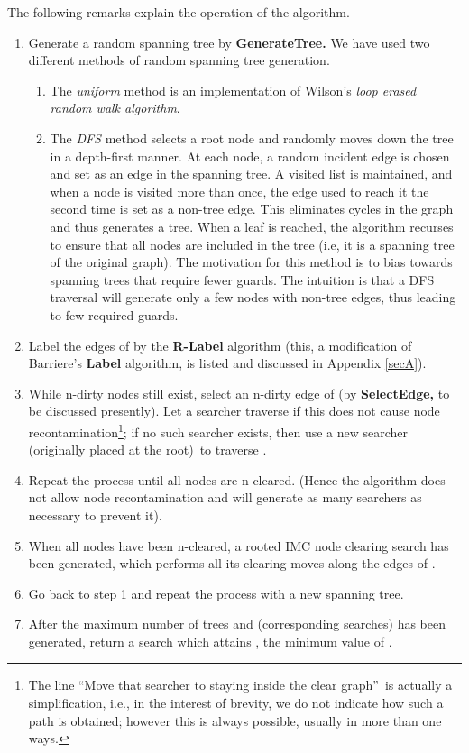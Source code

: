 \documentclass[11pt]{article}\usepackage{amsmath}
\begin{document}
The following remarks explain the operation of the algorithm.

\begin{enumerate}
\item Generate a random spanning tree  by \textbf{GenerateTree.}
We have used two different methods of random spanning tree generation.

\begin{enumerate}
\item The \emph{uniform} method is an implementation of Wilson's
\cite{Wilson1} \emph{loop erased random walk algorithm}.

\item The \emph{DFS} method selects a root node and randomly moves down the
tree in a depth-first manner. At each node, a random incident edge is chosen
and set as an edge in the spanning tree. A visited list is maintained, and
when a node is visited more than once, the edge used to reach it the second
time is set as a non-tree edge. This eliminates cycles in the graph and thus
generates a tree. When a leaf is reached, the algorithm recurses to ensure
that all nodes are included in the tree (i.e, it is a spanning tree of the
original graph). The motivation for this method is to bias towards spanning
trees that require fewer guards. The intuition is that a DFS traversal will
generate only a few nodes with non-tree edges, thus leading to few required guards.
\end{enumerate}

\item Label the edges of  by the \textbf{R-Label} algorithm (this,
a modification of Barriere's \textbf{Label} algorithm, is listed and discussed
in Appendix \ref{secA}).

\item While n-dirty nodes still exist, select an n-dirty edge  of
 (by \textbf{SelectEdge,} to be discussed presently). Let a
searcher traverse  if this does not cause node
recontamination\footnote{The line \textquotedblleft Move that searcher to 
staying inside the clear graph\textquotedblright\ is actually a
simplification, i.e., in the interest of brevity, we do not indicate how such
a path is obtained; however this is always possible, usually in more than one
ways.}; if no such searcher exists, then use a new searcher (originally placed
at the root)\ to traverse .

\item Repeat the process until all nodes are n-cleared. (Hence the algorithm
does not allow node recontamination and will generate as many searchers as
necessary to prevent it).

\item When all nodes have been n-cleared, a rooted IMC node clearing search
has been generated, which performs all its clearing moves along the edges of
.

\item Go back to step 1 and repeat the process with a new spanning tree.

\item After the maximum number of trees and (corresponding searches) has been
generated, return a search  which attains , the
minimum value of .
\end{enumerate}
\end{document}
